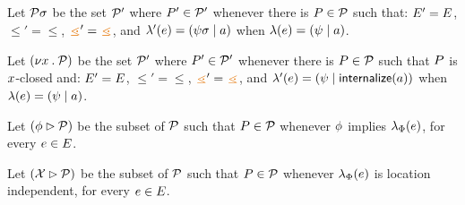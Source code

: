 \begin{definition}
  Let $\mathcal{P}\sigma$ be the set $\mathcal{P}'$ where $P'\in\mathcal{P}'$ whenever
there is $P\in\mathcal{P}$ such that:
$E' = E$,
${\le'} = {\le}$, 
${\gtN'} = {\gtN}$,
and
$\lambda'(e) = (\psi\sigma \mid a)$ when $\lambda(e) = (\psi \mid a)$.


Let $(\nu x\mathbin.\mathcal{P})$ be the set $\mathcal{P}'$ where $P'\in\mathcal{P}'$ whenever
there is $P\in\mathcal{P}$ such that $P$ is $x$-closed and:
$E' = E$,
${\le'} = {\le}$, 
${\gtN'} = {\gtN}$,
and
$\lambda'(e) = (\psi \mid \mathsf{internalize}(a))$ when $\lambda(e) = (\psi \mid a)$.

Let $(\phi \mathbin\rhd \mathcal{P})$ be the subset of $\mathcal{P}$ such that $P\in\mathcal{P}$ whenever
$\phi$ implies $\lambda_{\Phi}(e)$, for every $e\in E$. %

Let $(\mathcal{X}\mathbin\rhd \mathcal{P})$ be the subset of $\mathcal{P}$ such that
$P\in\mathcal{P}$ whenever $\lambda_{\Phi}(e)$ is location independent, for every $e\in E$.
\end{definition}





